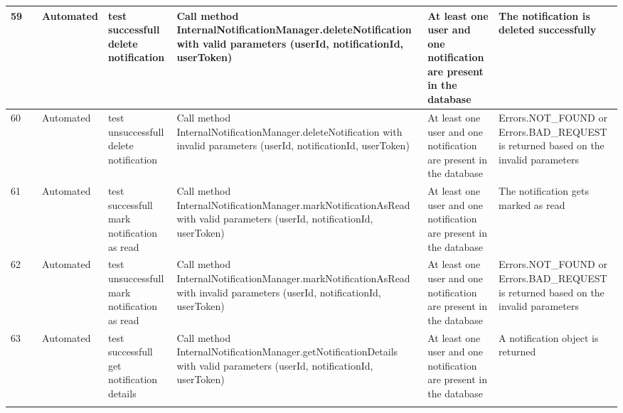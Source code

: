 \documentclass{article}
\begin{document}
{\begin{tabular}{|
      >{\columncolor[HTML]{FFFFFF}}l |
      >{\columncolor[HTML]{FFFFFF}}c |
      >{\columncolor[HTML]{FFFFFF}}l |l|l|l|l|}
    59 & \cellcolor[HTML]{FFFFFF}                                            & {\color[HTML]{11734B} Automated} & test successfull delete notification         & Call method InternalNotificationManager.deleteNotification with valid parameters (userId, notificationId, userToken)       & At least one user and one notification are present in the database                                                                  & The notification is deleted successfully                                             \\ \cline{1-1} \cline{3-7}
    60 & \cellcolor[HTML]{FFFFFF}                                            & {\color[HTML]{11734B} Automated} & test unsuccessfull delete notification       & Call method InternalNotificationManager.deleteNotification with invalid parameters (userId, notificationId, userToken)     & At least one user and one notification are present in the database                                                                  & Errors.NOT\_FOUND or Errors.BAD\_REQUEST is returned based on the invalid parameters \\ \cline{1-1} \cline{3-7}
    61 & \cellcolor[HTML]{FFFFFF}                                            & {\color[HTML]{11734B} Automated} & test successfull mark notification as read   & Call method InternalNotificationManager.markNotificationAsRead with valid parameters (userId, notificationId, userToken)   & At least one user and one notification are present in the database                                                                  & The notification gets marked as read                                                 \\ \cline{1-1} \cline{3-7}
    62 & \cellcolor[HTML]{FFFFFF}                                            & {\color[HTML]{11734B} Automated} & test unsuccessfull mark notification as read & Call method InternalNotificationManager.markNotificationAsRead with invalid parameters (userId, notificationId, userToken) & At least one user and one notification are present in the database                                                                  & Errors.NOT\_FOUND or Errors.BAD\_REQUEST is returned based on the invalid parameters \\ \cline{1-1} \cline{3-7}
    63 & \cellcolor[HTML]{FFFFFF}                                            & {\color[HTML]{11734B} Automated} & test successfull get notification details    & Call method InternalNotificationManager.getNotificationDetails with valid parameters (userId, notificationId, userToken)   & At least one user and one notification are present in the database                                                                  & A notification object is returned                                                    \\ \cline{1-1} \cline{3-7}

\end{tabular}}
\end{document}
